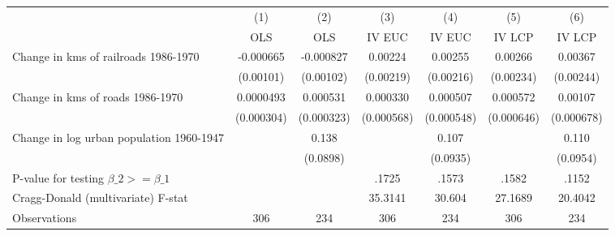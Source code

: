 {
\def\sym#1{\ifmmode^{#1}\else\(^{#1}\)\fi}
\begin{tabular}{l*{6}{c}}
\hline\hline
                &\multicolumn{1}{c}{(1)}&\multicolumn{1}{c}{(2)}&\multicolumn{1}{c}{(3)}&\multicolumn{1}{c}{(4)}&\multicolumn{1}{c}{(5)}&\multicolumn{1}{c}{(6)}\\
                &\multicolumn{1}{c}{OLS}&\multicolumn{1}{c}{OLS}&\multicolumn{1}{c}{IV EUC}&\multicolumn{1}{c}{IV EUC}&\multicolumn{1}{c}{IV LCP}&\multicolumn{1}{c}{IV LCP}\\
\hline
Change in kms of railroads 1986-1970&-0.000665         &-0.000827         &  0.00224         &  0.00255         &  0.00266         &  0.00367         \\
                &(0.00101)         &(0.00102)         &(0.00219)         &(0.00216)         &(0.00234)         &(0.00244)         \\
[1em]
Change in kms of roads 1986-1970&0.0000493         & 0.000531         & 0.000330         & 0.000507         & 0.000572         &  0.00107         \\
                &(0.000304)         &(0.000323)         &(0.000568)         &(0.000548)         &(0.000646)         &(0.000678)         \\
[1em]
Change in log urban population 1960-1947&                  &    0.138         &                  &    0.107         &                  &    0.110         \\
                &                  & (0.0898)         &                  & (0.0935)         &                  & (0.0954)         \\
\hline
P-value for testing $\beta\_{2} >= \beta\_{1}$&                  &                  &    .1725         &    .1573         &    .1582         &    .1152         \\
Cragg-Donald (multivariate) F-stat&                  &                  &  35.3141         &   30.604         &  27.1689         &  20.4042         \\
Observations    &      306         &      234         &      306         &      234         &      306         &      234         \\
\hline\hline
\end{tabular}
}
